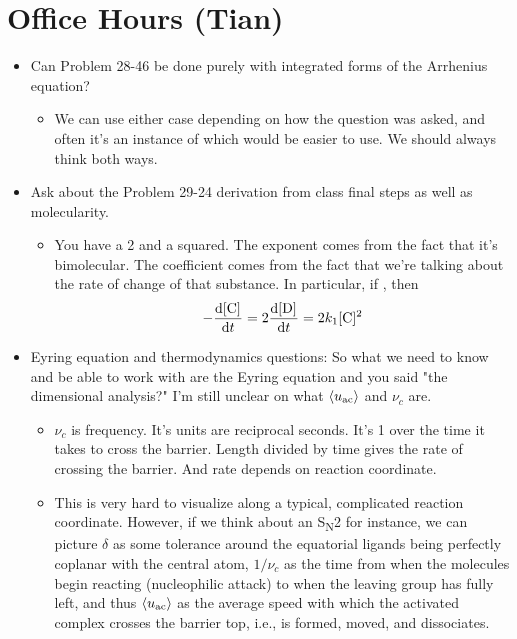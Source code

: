 \documentclass[../notes.tex]{subfiles}
\begin{document}
\section{Office Hours (Tian)}
\begin{itemize}
    \item Can Problem 28-46 be done purely with integrated forms of the Arrhenius equation?
    \begin{itemize}
        \item We can use either case depending on how the question was asked, and often it's an instance of which would be easier to use. We should always think both ways.
    \end{itemize}
    \item Ask about the Problem 29-24 derivation from class final steps as well as molecularity.
    \begin{itemize}
        \item You have a 2 and a squared. The exponent comes from the fact that it's bimolecular. The coefficient comes from the fact that we're talking about the rate of change of that substance. In particular, if , then
        \begin{equation*}
            -\dv{\cnc{C}}{t} = 2\dv{\cnc{D}}{t} = 2k_1\cnc{C}^2
        \end{equation*}
    \end{itemize}
    \item Eyring equation and thermodynamics questions: So what we need to know and be able to work with are the Eyring equation and you said "the dimensional analysis?" I'm still unclear on what $\left\langle{u_\text{ac}}\right\rangle$ and $\nu_c$ are.
    \begin{itemize}
        \item $\nu_c$ is frequency. It's units are reciprocal seconds. It's 1 over the time it takes to cross the barrier. Length divided by time gives the rate of crossing the barrier. And rate depends on reaction coordinate.
        \item This is very hard to visualize along a typical, complicated reaction coordinate. However, if we think about an S\textsubscript{N}2 for instance, we can picture $\delta$ as some tolerance around the equatorial ligands being perfectly coplanar with the central atom, $1/\nu_c$ as the time from when the molecules begin reacting (nucleophilic attack) to when the leaving group has fully left, and thus $\left\langle{u_\text{ac}}\right\rangle$ as the average speed with which the activated complex crosses the barrier top, i.e., is formed, moved, and dissociates.

\end{itemize}
\end{itemize}
\end{document}
